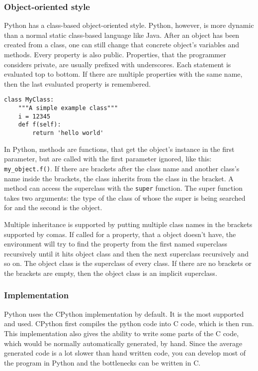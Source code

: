 \subsubsection{Object-oriented style}
Python has a class-based object-oriented style. Python, however, is more dynamic than a normal static class-based language like Java. After an object has been created from a class, one can still change that concrete object's variables and methods. Every property is also public. Properties, that the programmer considers private, are usually prefixed with underscores. Each statement is evaluated top to bottom. If there are multiple properties with the same name, then the last evaluated property is remembered.
\begin{verbatim}
class MyClass:
    """A simple example class"""
    i = 12345
    def f(self):
        return 'hello world'
\end{verbatim}
In Python, methods are functions, that get the object's instance in the first parameter, but are called with the first parameter ignored, like this: \verb;my_object.f();. If there are brackets after the class name and another class's name inside the brackets, the class inherits from the class in the bracket. A method can access the superclass with the \verb;super; function. The super function takes two arguments: the type of the class of whose the super is being searched for and the second is the object.

Multiple inheritance is supported by putting multiple class names in the brackets supported by comas. If called for a property, that a object doesn't have, the environment will try to find the property from the first named superclass recursively until it hits object class and then the next superclass recursively and so on. The object class is the superclass of every class. If there are no brackets or the brackets are empty, then the object class is an implicit superclass.

\subsubsection{Implementation}
Python uses the CPython implementation by default. It is the most supported and used. CPython first compiles the python code into C code, which is then run. This implementation also gives the ability to write some parts of the C code, which would be normally automatically generated, by hand. Since the average generated code is a lot slower than hand written code, you can develop most of the program in Python and the bottlenecks can be written in C.

